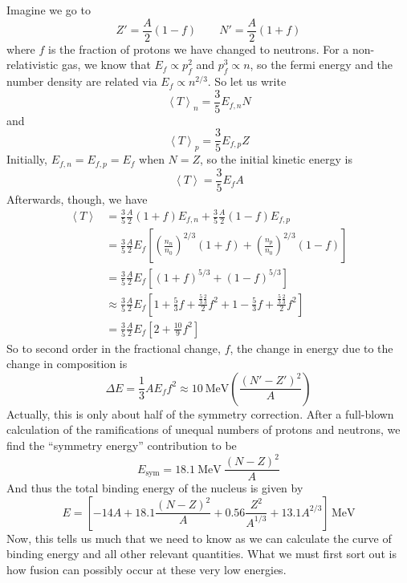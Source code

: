 \documentclass[10pt]{article}
\numberwithin{equation}{section}
\newcommand{\n}{\noindent}
\newcommand{\avg}[1]{\left\langle#1\right\rangle}
\begin{document}
  \n Imagine we go to
  \begin{equation}
    \label{eq:379}
    Z'=\frac{A}{2}(1-f)\qquad N'=\frac{A}{2}(1+f)
  \end{equation}
  where $f$ is the fraction of protons we have changed to
  neutrons. For a non-relativistic gas, we know that $E_f\propto
  p_f^2$ and $p_f^3\propto n$, so the fermi energy and the number
  density are related via $E_f\propto n^{2/3}$. So let us write
  \begin{equation}
    \label{eq:380}
    \avg{T}_n=\frac{3}{5}E_{f,n}N
  \end{equation}
  and
  \begin{equation}
    \label{eq:381}
    \avg{T}_p=\frac{3}{5}E_{f,p}Z
  \end{equation}
  Initially, $E_{f,n}=E_{f,p}=E_f$ when $N=Z$, so the initial kinetic
  energy is
  \begin{equation}
    \label{eq:382}
    \avg{T}=\frac{3}{5}E_fA
  \end{equation}
  Afterwards, though, we have
  \begin{align}
    \label{eq:383}
    \avg{T}&=\frac{3}{5}\frac{A}{2}(1+f)E_{f,n}+\frac{3}{5}\frac{A}{2}(1-f)E_{f,p}\\
    \label{eq:383a}
    &=
    \frac{3}{5}\frac{A}{2}E_f\left[\left(\frac{n_n}{n_0}\right)^{2/3}(1+f)+\left(\frac{n_p}{n_0}\right)^{2/3}(1-f)\right]\\
    \label{eq:383b}
    &= \frac{3}{5}\frac{A}{2}E_f\left[(1+f)^{5/3}+(1-f)^{5/3}\right]\\
    \label{eq:383c}
    &\approx
    \frac{3}{5}\frac{A}{2}E_f\left[1+\frac{5}{3}f+\frac{\frac{5}{3}\frac{2}{3}}{2}f^2+1-\frac{5}{3}f+\frac{\frac{5}{3}\frac{2}{3}}{2}f^2\right]\\
      \label{eq:383d}
      &= \frac{3}{5}\frac{A}{2}E_f\left[2+\frac{10}{9}f^2\right]
  \end{align}
  So to second order in the fractional change, $f$, the change in
  energy due to the change in composition is
  \begin{equation}
    \label{eq:384}
    \Delta E=\frac{1}{3}AE_f f^2\approx 10\ \mathrm{MeV}\left(\frac{(N'-Z')^2}{A}\right)
  \end{equation}
  Actually, this is only about half of the symmetry correction. After
  a full-blown calculation of the ramifications of unequal numbers of
  protons and neutrons, we find the ``symmetry energy'' contribution
  to be
  \begin{equation}
    \label{eq:275}
    E_{\mathrm{sym}}=18.1\ \mathrm{MeV}\ \frac{(N-Z)^2}{A}
  \end{equation}
  And thus the total binding energy of the nucleus is given by
  \begin{equation}
    \label{eq:304}
    \boxed{E=\left[-14A+18.1\frac{(N-Z)^2}{A}+0.56\frac{Z^2}{A^{1/3}}+13.1
    A^{2/3}\right]\, \mathrm{MeV}}
  \end{equation}
  Now, this tells us much that we need to know as we can calculate the
  curve of binding energy and all other relevant quantities. What we
  must first sort out is how fusion can possibly occur at these very
  low energies.\\
	
\end{document}
